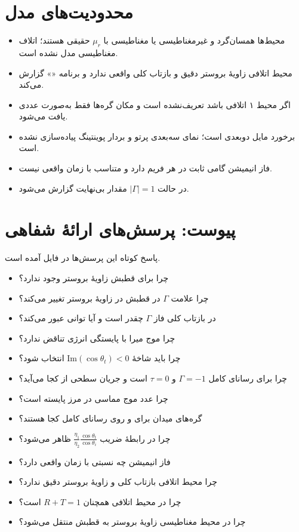 \documentclass[12pt,a4paper]{article}
\begin{document}
\section{محدودیت‌های مدل}
\begin{itemize}[rightmargin=1.2em,itemsep=2pt,topsep=3pt,label={$\bullet$}]
  \item محیط‌ها همسان‌گرد و غیرمغناطیسی یا مغناطیسی با $\mu_r$ حقیقی هستند؛ اتلاف مغناطیسی مدل نشده است.
  \item محیط اتلافی زاویۀ بروستر دقیق و بازتاب کلی واقعی ندارد و برنامه «» گزارش می‌کند.
  \item اگر محیط ۱ اتلافی باشد  تعریف‌نشده است و مکان گره‌ها فقط به‌صورت عددی یافت می‌شود.
  \item برخورد مایل دوبعدی است؛ نمای سه‌بعدی پرتو و بردار پوینتینگ پیاده‌سازی نشده است.
  \item فاز انیمیشن گامی ثابت در هر فریم دارد و متناسب با زمان واقعی نیست.
  \item در حالت $|\Gamma|=1$ مقدار  بی‌نهایت گزارش می‌شود.
\end{itemize}

\section{پیوست: پرسش‌های ارائۀ شفاهی}

پاسخ کوتاه این پرسش‌ها در فایل  آمده است.
\begin{itemize}[rightmargin=1.2em,itemsep=2pt,topsep=3pt,label={$\bullet$}]
  \item چرا برای قطبش  زاویۀ بروستر وجود ندارد؟
  \item چرا علامت $\Gamma$ در قطبش  در زاویۀ بروستر تغییر می‌کند؟
  \item در بازتاب کلی فاز $\Gamma$ چقدر است و آیا توانی عبور می‌کند؟
  \item چرا موج میرا با پایستگی انرژی تناقض ندارد؟
  \item چرا باید شاخۀ $\mathrm{Im}(\cos\theta_t)<0$ انتخاب شود؟
  \item چرا برای رسانای کامل $\Gamma=-1$ و $\tau=0$ است و جریان سطحی از کجا می‌آید؟
  \item چرا عدد موج مماسی در مرز پایسته است؟
  \item گره‌های میدان برای  و  روی رسانای کامل کجا هستند؟
  \item چرا در رابطۀ  ضریب $\frac{\eta_1}{\eta_2}\frac{\cos\theta_t}{\cos\theta_i}$ ظاهر می‌شود؟
  \item فاز انیمیشن چه نسبتی با زمان واقعی دارد؟
  \item چرا محیط اتلافی بازتاب کلی و زاویۀ بروستر دقیق ندارد؟
  \item چرا در محیط اتلافی همچنان $R+T=1$ است؟
  \item چرا در محیط مغناطیسی زاویۀ بروستر به قطبش  منتقل می‌شود؟
\end{itemize}
\end{document}
